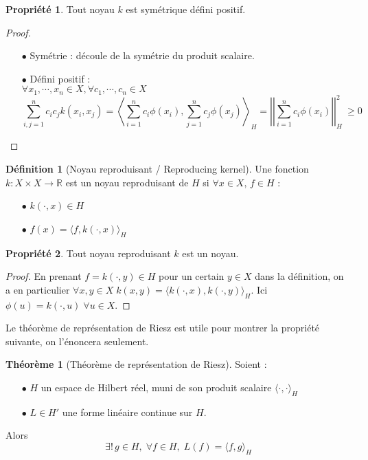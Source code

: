 \documentclass[a4paper, 11pt, french]{article}
\theoremstyle{definition}
\newtheorem{definition}{Définition}
\newtheorem{theorem}{Théorème}
\newtheorem{property}{Propriété}
\begin{document}
	\begin{property}
		Tout noyau $k$ est symétrique défini positif.
	\end{property}
	\begin{proof}
		\begin{itemize}
			\item[$\bullet$] Symétrie : découle de la symétrie du produit scalaire.			
			\item[$\bullet$] Défini positif : \\
			$\forall x_1, \cdots, x_n \in X, \forall c_1, \cdots, c_n \in X$
			\[\sum_{i,j=1}^{n} c_i c_j k(x_i, x_j) = \left\langle \sum_{i=1}^{n} c_i \phi(x_i), \sum_{j=1}^{n} c_j \phi(x_j) \right\rangle_H = \left|\left|\sum_{i=1}^{n} c_i \phi(x_i)\right|\right|_H^2\ \geq 0\]
		\end{itemize}
	\end{proof}

	\begin{definition}[Noyau reproduisant / Reproducing kernel]
		Une fonction $k : X \times X \to \mathbb{R}$ est un noyau reproduisant de $H$ si $\forall x \in X, \, f \in H$ :
		\begin{itemize}
			\item[$\bullet$] $k(\cdot, x) \in H$			
			\item[$\bullet$] $f(x) = \langle f, k(\cdot, x) \rangle_H$
		\end{itemize}
	\end{definition}

	\newpage

	\begin{property}
	\label{prop:reprotokernel}
		Tout noyau reproduisant $k$ est un noyau.
	\end{property}
	\begin{proof}
		En prenant $f = k(\cdot, y) \in H$ pour un certain $y \in X$ dans la définition, on a en particulier $\forall x, y \in X \; k(x,y) = \langle k(\cdot, x), k(\cdot, y) \rangle_H$. Ici $\phi(u) = k(\cdot, u) \; \forall u \in X$.
	\end{proof}

	Le théorème de représentation de Riesz est utile pour montrer la propriété suivante, on l'énoncera seulement.

	\begin{theorem}[Théorème de représentation de Riesz]
		Soient :
		\begin{itemize}
			\item[$\bullet$] $H$ un espace de Hilbert réel, muni de son produit scalaire $\langle \cdot, \cdot \rangle_H$
			\item[$\bullet$] $L \in H'$ une forme linéaire continue sur $H$.
		\end{itemize}
		Alors \[\exists ! \, g \in H, \; \forall f \in H, \; L(f) = \langle f, g \rangle_H\]
	\end{theorem}
\end{document}
